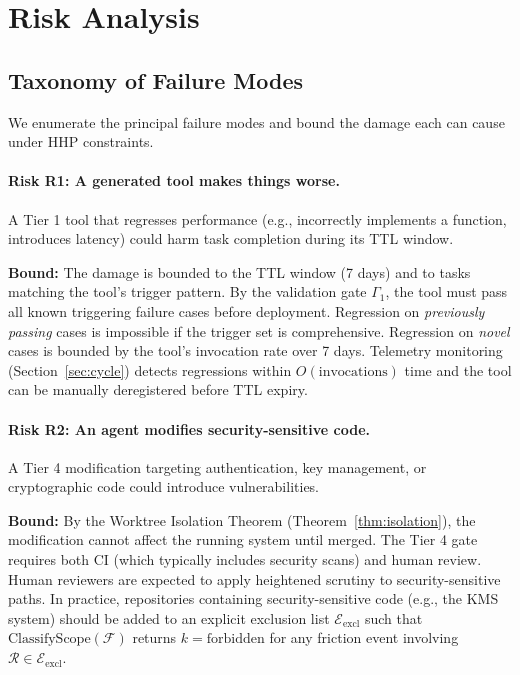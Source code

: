 \section{Risk Analysis}

\label{sec:risks}

\subsection{Taxonomy of Failure Modes}
\label{sec:failmodes}

We enumerate the principal failure modes and bound the damage each can cause
under HHP constraints.

\paragraph{Risk R1: A generated tool makes things worse.}
A Tier 1 tool that regresses performance (e.g., incorrectly implements a
function, introduces latency) could harm task completion during its TTL window.

\textbf{Bound:} The damage is bounded to the TTL window (7 days) and to tasks
matching the tool's trigger pattern. By the validation gate $\Gamma_1$, the
tool must pass all known triggering failure cases before deployment. Regression
on \emph{previously passing} cases is impossible if the trigger set is
comprehensive. Regression on \emph{novel} cases is bounded by the tool's
invocation rate over 7 days. Telemetry monitoring (Section~\ref{sec:cycle})
detects regressions within $O(\text{invocations})$ time and the tool can be
manually deregistered before TTL expiry.

\paragraph{Risk R2: An agent modifies security-sensitive code.}
A Tier 4 modification targeting authentication, key management, or cryptographic
code could introduce vulnerabilities.

\textbf{Bound:} By the Worktree Isolation Theorem (Theorem~\ref{thm:isolation}),
the modification cannot affect the running system until merged. The Tier 4 gate
requires both CI (which typically includes security scans) and human review.
Human reviewers are expected to apply heightened scrutiny to security-sensitive
paths. In practice, repositories containing security-sensitive code (e.g., the
KMS system) should be added to an explicit exclusion list $\mathcal{E}_{\text{excl}}$
such that $\text{ClassifyScope}(\mathcal{F})$ returns $k = \text{forbidden}$ for
any friction event involving $\mathcal{R} \in \mathcal{E}_{\text{excl}}$.

